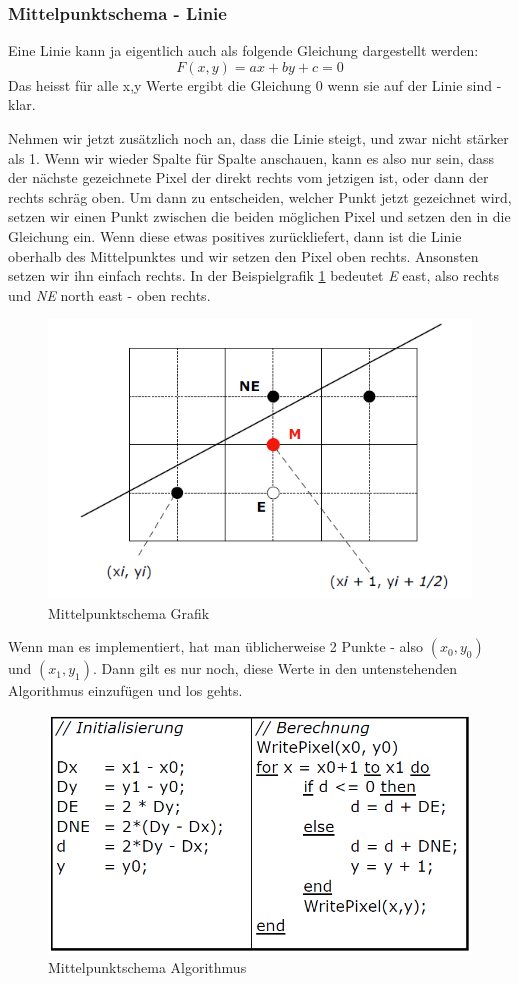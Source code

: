 \subsubsection{Mittelpunktschema - Linie}
Eine Linie kann ja eigentlich auch als folgende Gleichung dargestellt werden:
\begin{displaymath}
F(x,y) = ax+by+c = 0
\end{displaymath}
Das heisst für alle x,y Werte ergibt die Gleichung 0 wenn sie auf der Linie sind - klar.

Nehmen wir jetzt zusätzlich noch an, dass die Linie steigt, und zwar nicht stärker als 1. Wenn wir wieder Spalte für Spalte anschauen, kann es also nur sein, dass der nächste gezeichnete Pixel der direkt rechts vom jetzigen ist, oder dann der rechts schräg oben. Um dann zu entscheiden, welcher Punkt jetzt gezeichnet wird, setzen wir einen Punkt zwischen die beiden möglichen Pixel und setzen den in die Gleichung ein. Wenn diese etwas positives zurückliefert, dann ist die Linie oberhalb des Mittelpunktes und wir setzen den Pixel oben rechts. Ansonsten setzen wir ihn einfach rechts. In der Beispielgrafik \ref{fig:mittelpunktschema} bedeutet \textit{E} east, also rechts und \textit{NE} north east - oben rechts.\\
\begin{figure}[!ht]
	\centering
	\includegraphics[width=0.4\linewidth]{fig/mittelpunktschema}
	\caption{Mittelpunktschema Grafik}
	\label{fig:mittelpunktschema}
\end{figure}
Wenn man es implementiert, hat man üblicherweise 2 Punkte - also \((x_0,y_0)\) und \((x_1,y_1)\). Dann gilt es nur noch, diese Werte in den untenstehenden Algorithmus einzufügen und los gehts.
\begin{figure}[!ht]
	\centering
	\includegraphics[width=0.4\linewidth]{fig/mittelpunktschema_algo}
	\caption{Mittelpunktschema Algorithmus}
	\label{fig:mittelpunktschema_algo}
\end{figure}
